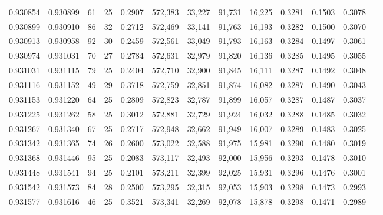 \begin{tabular}{rrrrrrrrrrrrr}
0.930854 & 0.930899 &    61 &  25 &                                     0.2907 & 572,383 &  33,227 &  91,731 &  16,225 & 0.3281 & 0.1503 & 0.3078 \\
0.930899 & 0.930910 &    86 &  32 &                                     0.2712 & 572,469 &  33,141 &  91,763 &  16,193 & 0.3282 & 0.1500 & 0.3070 \\
0.930913 & 0.930958 &    92 &  30 &                                     0.2459 & 572,561 &  33,049 &  91,793 &  16,163 & 0.3284 & 0.1497 & 0.3061 \\
0.930974 & 0.931031 &    70 &  27 &                                     0.2784 & 572,631 &  32,979 &  91,820 &  16,136 & 0.3285 & 0.1495 & 0.3055 \\
0.931031 & 0.931115 &    79 &  25 &                                     0.2404 & 572,710 &  32,900 &  91,845 &  16,111 & 0.3287 & 0.1492 & 0.3048 \\
0.931116 & 0.931152 &    49 &  29 &                                     0.3718 & 572,759 &  32,851 &  91,874 &  16,082 & 0.3287 & 0.1490 & 0.3043 \\
0.931153 & 0.931220 &    64 &  25 &                                     0.2809 & 572,823 &  32,787 &  91,899 &  16,057 & 0.3287 & 0.1487 & 0.3037 \\
0.931225 & 0.931262 &    58 &  25 &                                     0.3012 & 572,881 &  32,729 &  91,924 &  16,032 & 0.3288 & 0.1485 & 0.3032 \\
0.931267 & 0.931340 &    67 &  25 &                                     0.2717 & 572,948 &  32,662 &  91,949 &  16,007 & 0.3289 & 0.1483 & 0.3025 \\
0.931342 & 0.931365 &    74 &  26 &                                     0.2600 & 573,022 &  32,588 &  91,975 &  15,981 & 0.3290 & 0.1480 & 0.3019 \\
0.931368 & 0.931446 &    95 &  25 &                                     0.2083 & 573,117 &  32,493 &  92,000 &  15,956 & 0.3293 & 0.1478 & 0.3010 \\
0.931448 & 0.931541 &    94 &  25 &                                     0.2101 & 573,211 &  32,399 &  92,025 &  15,931 & 0.3296 & 0.1476 & 0.3001 \\
0.931542 & 0.931573 &    84 &  28 &                                     0.2500 & 573,295 &  32,315 &  92,053 &  15,903 & 0.3298 & 0.1473 & 0.2993 \\
0.931577 & 0.931616 &    46 &  25 &                                     0.3521 & 573,341 &  32,269 &  92,078 &  15,878 & 0.3298 & 0.1471 & 0.2989 \\

\end{tabular}
